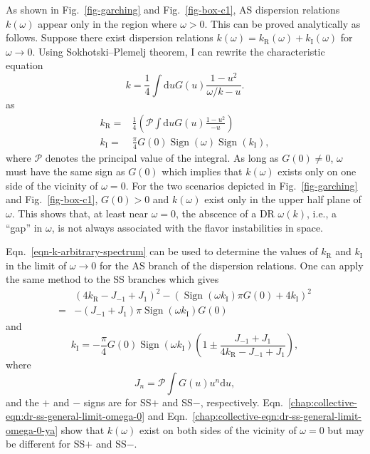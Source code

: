 As shown in Fig.~\ref{fig-garching} and Fig.~\ref{fig-box-c1}, AS dispersion relations $k(\omega)$ appear only in the region where $\omega > 0$. This can be proved analytically as follows.
Suppose there exist dispersion relations $k(\omega) = k_{\mathrm R}(\omega) + k_{\mathrm I}(\omega)$ for $\omega \to 0$. Using Sokhotski–Plemelj theorem, I can rewrite the characteristic equation
\begin{equation}
   k = \frac{1}{4} \int \mathrm du G(u) \frac{ 1 - u^2 }{ \omega/k - u }.
   \label{chap:collective-eqn:k-omega-relation}
\end{equation}
as
\begin{subequations}
\begin{align}
k_{\mathrm R} =& \frac{1}{4}\left(  \mathcal{P} \int \mathrm d u G(u) \frac{ 1 - u^2 }{ - u }  \right)\label{eqn-re-k-arbitrary-spectrum} \\
k_{\mathrm I} =&  \frac{\pi}{4}G(0) \operatorname{Sign}\left( \omega \right) \operatorname{Sign}\left(  k_{\mathrm I}  \right),
\label{eqn-im-k-arbitrary-spectrum}
\end{align}
\label{eqn-k-arbitrary-spectrum}
\end{subequations}
where $\mathcal P$ denotes the principal value of the integral. As long as $G(0)\neq 0$, $\omega$ must have the same sign as $G(0)$ which implies that $k(\omega)$ exists only on one side of the vicinity of $\omega=0$. For the two scenarios depicted in Fig.~\ref{fig-garching} and Fig.~\ref{fig-box-c1}, $G(0)>0$ and $k(\omega)$ exist only in the upper half plane of $\omega$. This shows that, at least near $\omega =0$, the abscence of a DR $\omega(k)$, i.e., a ``gap'' in $\omega$, is not always associated with the flavor instabilities in space.

Eqn.~\ref{eqn-k-arbitrary-spectrum} can be used to determine the values of $k_{\mathrm R}$ and $k_{\mathrm I}$ in the limit of $\omega\to 0$ for the AS branch of the dispersion relations. One can apply the same method to the SS branches which gives
\begin{align}
&\left(4 k_{\mathrm R} - J_{-1} + J_1 \right)^2  - \left( \operatorname{Sign}(\omega k_{\mathrm I} )\pi G(0) +4 k_{\mathrm I} \right)^2 \\
=& - \left( J_{-1} + J_1 \right) \pi \operatorname{Sign}(\omega k_{\mathrm I} ) G(0)
\label{chap:collective-eqn:dr-ss-general-limit-omega-0}
\end{align}
and
\begin{equation}
   k_{\mathrm I} = - \frac{\pi}{4} G(0) \operatorname{Sign}(\omega k_{\mathrm I} ) \left(  1 \pm \frac{ J_{-1} +  J_1 }{ 4 k_{\mathrm R} - J_{-1} + J_1}  \right),
   \label{chap:collective-eqn:dr-ss-general-limit-omega-0-ya}
\end{equation}
where
\begin{equation}
J_{n} = \mathcal P \int G(u)u^n \mathrm du,
\end{equation}
and the $+$ and $-$ signs are for SS$+$ and SS$-$, respectively. Eqn.~\ref{chap:collective-eqn:dr-ss-general-limit-omega-0} and Eqn.~\ref{chap:collective-eqn:dr-ss-general-limit-omega-0-ya} show that $k(\omega)$ exist on both sides of the vicinity of $\omega=0$ but may be different for SS$+$ and SS$-$.


